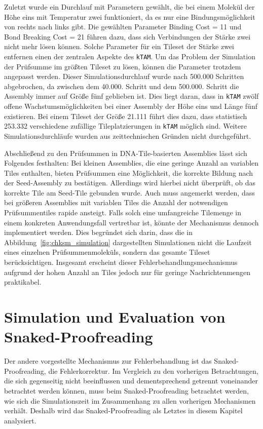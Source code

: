 Zuletzt wurde ein Durchlauf mit Parametern gewählt, die bei einem Molekül der Höhe eins mit Temperatur zwei funktioniert, da es nur eine Bindungsmöglichkeit von rechts nach links gibt. Die gewählten Parameter Binding Cost = 11 und Bond Breaking Cost = 21 führen dazu, dass sich Verbindungen der Stärke zwei nicht mehr lösen können. Solche Parameter für ein Tileset der Stärke zwei entfernen einen der zentralen Aspekte des \texttt{kTAM}. Um das Problem der Simulation der Prüfsumme im größten Tileset zu lösen, können die Parameter trotzdem angepasst werden. Dieser Simulationsdurchlauf wurde nach 500.000 Schritten abgebrochen, da zwischen dem 40.000. Schritt und dem 500.000. Schritt die Assembly immer auf Größe fünf geblieben ist. Dies liegt daran, dass in \texttt{kTAM} zwölf offene Wachstumsmöglichkeiten bei einer Assembly der Höhe eins und Länge fünf existieren. Bei einem Tileset der Größe 21.111 führt dies dazu, dass statistisch 253.332 verschiedene zufällige Tileplatzierungen in \texttt{kTAM} möglich sind. Weitere Simulationsdurchläufe wurden aus zeittechnischen Gründen nicht durchgeführt.

Abschließend zu den Prüfsummen in DNA-Tile-basierten Assemblies lässt sich Folgendes festhalten: Bei kleinen Assemblies, die eine geringe Anzahl an variablen Tiles enthalten, bieten Prüfsummen eine Möglichkeit, die korrekte Bildung nach der Seed-Assembly zu bestätigen. Allerdings wird hierbei nicht überprüft, ob das korrekte Tile am Seed-Tile gebunden wurde. Auch muss angemerkt werden, dass bei größeren Assemblies mit variablen Tiles die Anzahl der notwendigen Prüfsummentiles rapide ansteigt. Falls solch eine umfangreiche Tilemenge in einem konkreten Anwendungsfall vertretbar ist, könnte der Mechanismus dennoch implementiert werden. Dies begründet sich darin, dass die in Abbildung~\ref{fig:chksm_simulation} dargestellten Simulationen nicht die Laufzeit eines einzelnen Prüfsummenmoleküls, sondern das gesamte Tileset berücksichtigen. Insgesamt erscheint dieser Fehlerbehandlungsmechanismus aufgrund der hohen Anzahl an Tiles jedoch nur für geringe Nachrichtenmengen praktikabel.

\section{Simulation und Evaluation von Snaked-Proofreading }

Der andere vorgestellte Mechanismus zur Fehlerbehandlung ist das Snaked-Proofreading, die Fehlerkorrektur. Im Vergleich zu den vorherigen Betrachtungen, die sich gegenseitig nicht beeinflussen und dementsprechend getrennt voneinander betrachtet werden können, muss beim Snaked-Proofreading betrachtet werden, wie sich die Simulationszeit im Zusammenhang zu allen vorherigen Mechanismen verhält. Deshalb wird das Snaked-Proofreading als Letztes in diesem Kapitel analysiert. 

